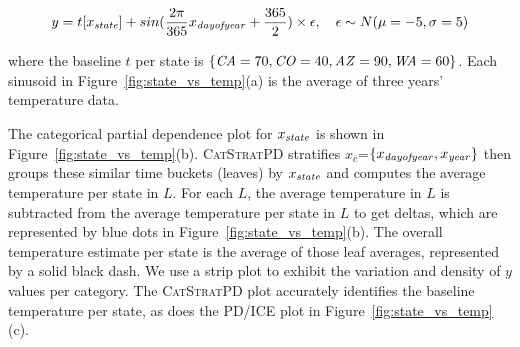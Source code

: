 \documentclass[12pt]{article}
\newcommand{\figref}[1]{Figure~\ref{#1}}
\newcommand{\cspd}{\fontfamily{cmr}\textsc{\small CatStratPD}}
\newcommand{\xnc}{$x_{\overline{c}}$}
\begin{document}
{\begin{appendices}
\begin{equation}\label{eq:weather}
y = t[x_{\it state}] + sin(\frac{2 \pi}{365} x_{\it dayofyear} + \frac{365}{2}) \times \epsilon, ~~~ \epsilon \sim N(\mu=-5,\sigma=5)
\end{equation}

\noindent where the baseline $t$ per state is $\{{\it CA}=70, {\it CO}=40, {\it AZ}=90, {\it WA}=60\}$. Each sinusoid in \figref{fig:state_vs_temp}(a) is the average of three years' temperature data.

The categorical partial dependence plot for $x_{\it state}$ is shown in \figref{fig:state_vs_temp}(b).
\cspd{} stratifies \xnc{}=$\{x_{\it dayofyear}, x_{\it year}\}$ then groups these similar time buckets (leaves) by $x_{\it state}$ and computes the average temperature per state in $L$. For each $L$, the average temperature in $L$ is subtracted from the average temperature per state in $L$ to get deltas, which are represented by blue dots in \figref{fig:state_vs_temp}(b). The overall temperature estimate per state is the average of those leaf averages, represented by a solid black dash. We use a strip plot to exhibit the variation and density of $y$ values per category. The \cspd{} plot accurately identifies the baseline temperature per state, as does the PD/ICE plot in \figref{fig:state_vs_temp}(c).


\end{appendices}}
\end{document}
